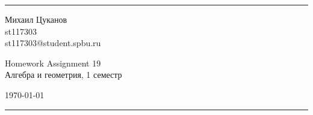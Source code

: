 \documentclass[a4paper, 12pt]{article}
\begin{document}

\fancyhead[C]{}
\hrule \medskip %
\begin{minipage}{0.295\textwidth}
\raggedright\footnotesize
Михаил Цуканов \hfill\\
st117303 \hfill\\
st117303@student.spbu.ru
\end{minipage}
\begin{minipage}{0.4\textwidth}
\centering\large
Homework Assignment 19\\
\normalsize
Алгебра и геометрия, 1 семестр\\
\end{minipage}
\begin{minipage}{0.295\textwidth}
\raggedleft
\today\hfill\\
\end{minipage}
\medskip\hrule
\bigskip

\end{document}
